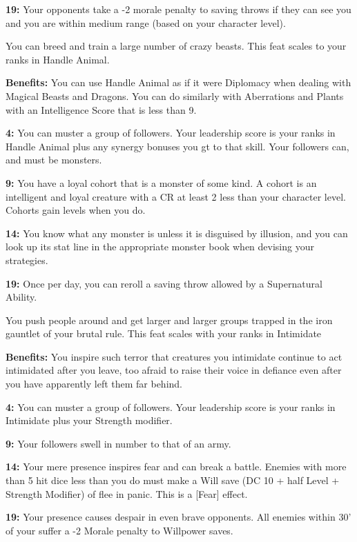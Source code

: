 \textbf{19:} Your opponents take a -2 morale penalty to saving throws if they can see you and you are within medium range (based on your character level).


You can breed and train a large number of crazy beasts. This feat scales to your ranks in Handle Animal.

\textbf{Benefits:} You can use Handle Animal as if it were Diplomacy when dealing with Magical Beasts and Dragons. You can do similarly with Aberrations and Plants with an Intelligence Score that is less than 9.

\textbf{4:} You can muster a group of followers. Your leadership score is your ranks in Handle Animal plus any synergy bonuses you gt to that skill. Your followers can, and must be monsters.

\textbf{9:} You have a loyal cohort that is a monster of some kind. A cohort is an intelligent and loyal creature with a CR at least 2 less than your character level. Cohorts gain levels when you do.

\textbf{14:} You know what any monster is unless it is disguised by illusion, and you can look up its stat line in the appropriate monster book when devising your strategies.

\textbf{19:} Once per day, you can reroll a saving throw allowed by a Supernatural Ability.

You push people around and get larger and larger groups trapped in the iron gauntlet of your brutal rule. This feat scales with your ranks in Intimidate

\textbf{Benefits:} You inspire such terror that creatures you intimidate continue to act intimidated after you leave, too afraid to raise their voice in defiance even after you have apparently left them far behind.

\textbf{4:} You can muster a group of followers. Your leadership score is your ranks in Intimidate plus your Strength modifier.

\textbf{9:} Your followers swell in number to that of an army.

\textbf{14:} Your mere presence inspires fear and can break a battle. Enemies with more than 5 hit dice less than you do must make a Will save (DC 10 + half Level + Strength Modifier) of flee in panic. This is a [Fear] effect.

\textbf{19:} Your presence causes despair in even brave opponents. All enemies within 30' of your suffer a -2 Morale penalty to Willpower saves.
